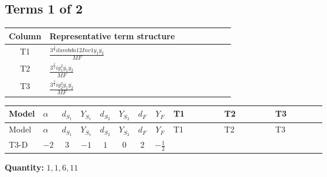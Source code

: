 \documentclass[8pt]{article}
\begin{document}
\begin{landscape}
\subsection*{Terms 1 of 2}
\begin{center}
\begin{tabular}{@{}c >{\raggedright\arraybackslash}p{0.82\linewidth}@{}}
\toprule
Column & Representative term structure \\
\midrule
T1 & \(\displaystyle \frac{3^{\frac{3}{4}} i lambda12Inv1 \overline{y_{1}} \overline{y_{2}}}{MF}\) \\
\midrule
T2 & \(\displaystyle \frac{3^{\frac{3}{4}} i g_{1}^{2} \overline{y_{1}} \overline{y_{2}}}{MF}\) \\
\midrule
T3 & \(\displaystyle \frac{3^{\frac{3}{4}} i g_{2}^{2} \overline{y_{1}} \overline{y_{2}}}{MF}\) \\
\midrule
\bottomrule
\end{tabular}
\end{center}
\smallskip
\tiny
\begin{longtable}{@{}llcccccc >{\raggedright\arraybackslash}p{0.21\linewidth} >{\raggedright\arraybackslash}p{0.21\linewidth} >{\raggedright\arraybackslash}p{0.21\linewidth}@{}}
\toprule
Model & $\alpha$ & $d_{S_1}$ & $Y_{S_1}$ & $d_{S_2}$ & $Y_{S_2}$ & $d_F$ & $Y_F$ & T1 & T2 & T3 \\
\midrule
\endfirsthead
\toprule
Model & $\alpha$ & $d_{S_1}$ & $Y_{S_1}$ & $d_{S_2}$ & $Y_{S_2}$ & $d_F$ & $Y_F$ & T1 & T2 & T3 \\
\midrule
\endhead
T3-D & $-2$ & $3$ & $-1$ & $1$ & $0$ & $2$ & $-\frac{1}{2}$ & \scriptsize\adjustbox{max width=\linewidth}{$\begin{gathered} \frac{3^{\frac{3}{4}} i lambda12Inv1 \overline{y_{1}} \overline{y_{2}}}{6 MF}\end{gathered}$} & \scriptsize\adjustbox{max width=\linewidth}{$\begin{gathered} \frac{3^{\frac{3}{4}} i g_{1}^{2} \overline{y_{1}} \overline{y_{2}}}{8 MF}\end{gathered}$} & \scriptsize\adjustbox{max width=\linewidth}{$\begin{gathered} \frac{17 \cdot 3^{\frac{3}{4}} i g_{2}^{2} \overline{y_{1}} \overline{y_{2}}}{24 MF}\end{gathered}$} \\
\midrule
\bottomrule
\end{longtable}
\clearpage
\noindent\textbf{Quantity: }$\mathrm{1,1,6,11}$\par\smallskip

\end{landscape}
\end{document}
